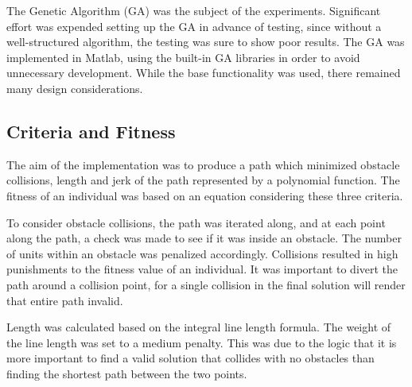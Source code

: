%
The Genetic Algorithm (GA) was the subject of the experiments. Significant effort was expended setting up the GA in advance of testing, since without a well-structured algorithm, the testing was sure to show poor results. The GA was implemented in Matlab, using the built-in GA libraries in order to avoid unnecessary development. While the base functionality was used, there remained many design considerations.

\subsection{Criteria and Fitness}
The aim of the implementation was to produce a path which minimized obstacle collisions, length and jerk of the path represented by a polynomial function. The fitness of an individual was based on an equation considering these three criteria.

To consider obstacle collisions, the path was iterated along, and at each point along the path, a check was made to see if it was inside an obstacle. The number of units within an obstacle was penalized accordingly. Collisions resulted in high punishments to the fitness value of an individual. It was important to divert the path around a collision point, for a single collision in the final solution will render that entire path invalid.

Length was calculated based on the integral line length formula. The weight of the line length was set to a medium penalty. This was due to the logic that it is more important to find a valid solution that collides with no obstacles than finding the shortest path between the two points.

